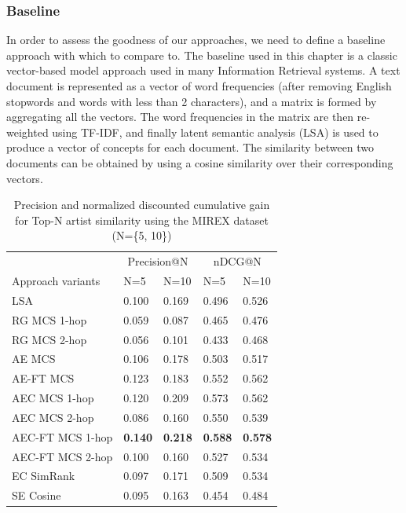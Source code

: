 \subsubsection{Baseline} %
In order to assess the goodness of our approaches, we need to define a baseline approach with which to compare to. The baseline used in this chapter is a classic vector-based model approach used in many Information Retrieval systems. A text document is represented as a vector of word frequencies (after removing English stopwords and words with less than 2 characters), and a matrix is formed by aggregating all the vectors. The word frequencies in the matrix are then re-weighted using TF-IDF, and finally latent semantic analysis (LSA) \cite{Deerwesteretal1990} is used to produce a vector of concepts for each document. The similarity between two documents can be obtained by using a cosine similarity over their corresponding vectors.

\begin{table}[ht!]
\small
\centering
	\begin{tabular}{  lllll }
 	\toprule
& \multicolumn{2}{c}{Precision@N} & \multicolumn{2}{c}{nDCG@N} \\
\cmidrule(lr){2-3}
\cmidrule(lr){4-5}
	Approach variants & N=5 & N=10 & N=5 & N=10 \\
	\midrule
LSA & 0.100 & 0.169 & 0.496 & 0.526 \\
RG MCS 1-hop & 0.059 & 0.087 & 0.465 & 0.476 \\
RG MCS 2-hop & 0.056 & 0.101 & 0.433 & 0.468 \\
AE MCS & 0.106 & 0.178 & 0.503  & 0.517 \\
AE-FT MCS & 0.123 & 0.183 & 0.552 & 0.562 \\
AEC MCS 1-hop & 0.120 & 0.209 & 0.573 & 0.562 \\
AEC MCS 2-hop & 0.086 & 0.160 & 0.550 & 0.539 \\
AEC-FT MCS 1-hop & \textbf{0.140} & \textbf{0.218} & \textbf{0.588} & \textbf{0.578} \\
AEC-FT MCS 2-hop & 0.100 & 0.160 & 0.527 & 0.534 \\
EC SimRank & 0.097& 0.171 &  0.509 & 0.534 \\
SE Cosine & 0.095 & 0.163 & 0.454 & 0.484 \\
\bottomrule	
	\end{tabular}
	\caption{Precision and normalized discounted cumulative gain for Top-N artist similarity using the MIREX dataset (N=\{5, 10\})}	
	\label{tbl:similarity:res_mirex}
\end{table}

